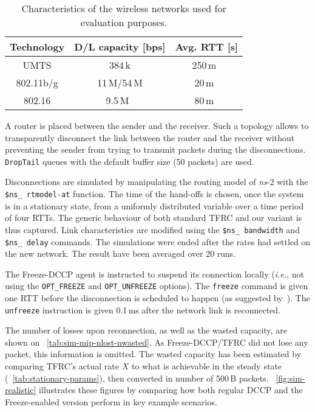 \documentclass[twocolumn]{nictatechreport}
\newcommand{\latinlocution}[1]{\textit{#1}}
\newcommand{\ie}{\latinlocution{i.e.}}
\newcommand{\ns}{\textit{ns}}
\begin{document}
\begin{table}
  \caption{Characteristics of the wireless networks used for
  evaluation purposes.}
  \label{tab:characteristics}
  \centering
  \begin{tabular}{ccc}
    \toprule
    \textbf{Technology} & \textbf{D/L capacity [bps]} & \textbf{Avg. RTT [s]} \\
    \midrule
    UMTS & 384\,k & 250\,m~\cite{2005vacirca_umts_grprs_rtt_measurements} \\
    802.11b/g & 11\,M/54\,M & 20\,m~\cite{2005karapantelakis_ad-hoc_delay_experiments} \\
    802.16 & 9.5\,M~\cite{2007grondalen_wimax_measures} & 80\,m~\cite{2008halepovic_tcp_wimax} \\
\bottomrule
  \end{tabular}
\end{table}

A router is placed between the sender and the receiver. Such a topology allows
to transparently disconnect the link between the router and the receiver without
preventing the sender from trying to transmit packets during the disconnections.
\verb#DropTail# queues with the default buffer size (50 packets) are used.

Disconnections are simulated by manipulating the routing model of \ns-2 with the
\verb#$ns_ rtmodel-at# function. The time of the hand-offs is chosen, once the
system is in a stationary state, from a uniformly distributed variable over a
time period of four RTTs. The generic behaviour of both standard TFRC and our
variant is thus captured. Link characteristics are modified using the
\verb#$ns_ bandwidth#
and \verb#$ns_ delay# commands.  The simulations were ended after the rates had
settled on the new network. The result have been averaged over 20
runs.

The Freeze-DCCP agent is instructed to suspend its connection locally (\ie, not
using the \verb#OPT_FREEZE# and \verb#OPT_UNFREEZE# options).  The \verb#freeze#
command is given one RTT  before the disconnection is scheduled to happen (as
suggested by~\cite{2000goff_freezetcp}). The \verb#unfreeze# instruction is
given 0.1\,ms after the network link is reconnected.

The number of losses upon reconnection, as well as the wasted capacity, are shown
on \tablename~\ref{tab:sim-mip-nlost-nwasted}. As Freeze-DCCP/TFRC did not
lose any packet, this information is omitted.  The wasted capacity has
been estimated by comparing TFRC's actual rate $X$ to what is achievable in the
steady state (\tablename~\ref{tab:stationary-params}), then converted in number
of 500\,B packets. \figurename~\ref{fig:sim-realistic} illustrates these
figures by comparing how both regular DCCP and the Freeze-enabled version
perform in key example scenarios.
\end{document}
